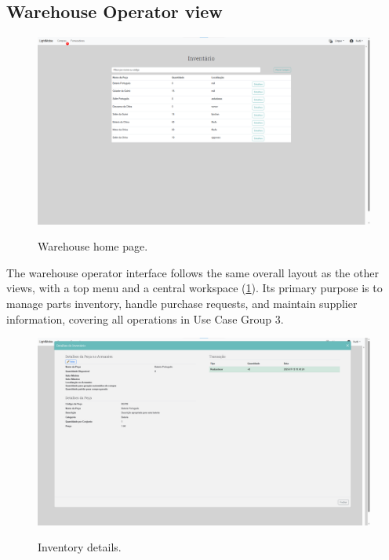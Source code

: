 \subsection{Warehouse Operator view}


\begin{figure}[h]
  \caption{Warehouse home page.}
  \centering
  \includegraphics[width=\textwidth]{figs/Implementation/warehouse/homepage}
  \label{fig:warehouseHomepage}
\end{figure}



The warehouse operator interface follows the same overall layout as the other views, with a top menu and a central workspace (\ref{fig:warehouseHomepage}). Its primary purpose is to manage parts inventory, handle purchase requests, and maintain supplier information, covering all operations in Use Case Group 3.


\begin{figure}[h]
  \caption{Inventory details.}
  \centering
  \includegraphics[width=\textwidth]{figs/Implementation/warehouse/inventoryDetails}
  \label{fig:inventoryDetails}
\end{figure}


